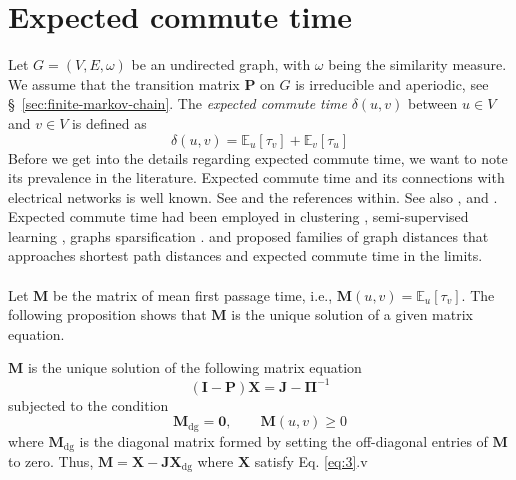 \section{Expected commute time}
\label{sec:expect-comm-time}
Let $G = (V,E,\omega)$ be an undirected graph, with $\omega$ being the
similarity measure. We assume that the transition matrix
$\mathbf{P}$ on $G$ is irreducible and aperiodic, see
\S ~\ref{sec:finite-markov-chain}. The {\em expected commute time}
$\delta(u,v)$ between $u \in V$ and $v \in V$ is defined as
\begin{equation}
  \label{eq:25}
  \delta(u,v) = \mathbb{E}_{u}[\tau_v] + \mathbb{E}_{v}[\tau_u]
\end{equation}
Before we get into the details regarding expected commute time, we
want to note its prevalence in the literature. Expected commute time
and its connections with electrical networks is well known. See
\citet{doyle84:_random_walks_elect_networ,klein93:_resis_distan} and
the references within. See also \citep[\S 9 and
\S10][]{levin09:_markov}, \citep[\S 4][]{aldous99:_rever_markov} and
\citep{lyons:_probab_trees_networ}. Expected commute time had been
employed in clustering \citep{saerens04,yen07:_graph,qui07:_clust},
semi-supervised learning
\citep{szummer01:_partial_markov,zhou04:_learn,zhou04:_learn_label_unlab,zhu03:_semi_super_learn_using_gauss},
graphs sparsification
\citep{spielmand08:_graph}. \citet{yen08:_famil_of_dissim_measur_between}
and \citet{chebotarev08:_new_famil_of_graph_distan} proposed families
of graph distances that approaches shortest path distances and
expected commute time in the limits. \\ \\
%
%
\noindent Let $\mathbf{M}$ be the matrix of mean first passage time,
i.e., $\mathbf{M}(u,v) = \mathbb{E}_{u}[\tau_v]$. The following
proposition shows that $\mathbf{M}$ is the unique solution of a given
matrix equation.
\begin{proposition}
  \label{prop:4}
 $\mathbf{M}$ is the unique solution of the following matrix equation
  \begin{equation}
    \label{eq:3}
   (\mathbf{I} - \mathbf{P})\mathbf{X} = \mathbf{J} - \bm{\Pi}^{-1}
  \end{equation}
  subjected to the condition 
  \begin{equation}
    \label{eq:32}
 \mathbf{M}_{\mathrm{dg}} = \mathbf{0}, \qquad \mathbf{M}(u,v) \geq 0   
  \end{equation}
  where $\mathbf{M}_{\mathrm{dg}}$ is the diagonal matrix formed
    by setting the off-diagonal entries of $\mathbf{M}$ to zero.
    Thus, $\mathbf{M} = \mathbf{X} -
    \mathbf{J}\mathbf{X}_{\mathrm{dg}}$ where $\mathbf{X}$ satisfy
    Eq. \eqref{eq:3}.v
\end{proposition}
